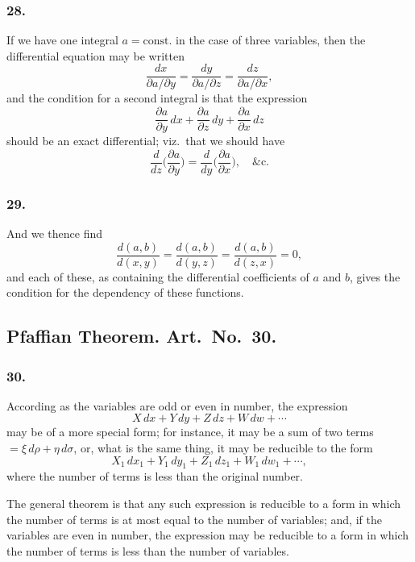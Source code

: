 \documentclass[12pt,a4paper]{article}
\theoremstyle{plain}
\begin{document}
\newpage
\setcounter{page}{124}

\subsubsection*{28.}

If we have one integral $a = \text{const.}$ in the case of three variables, then the differential equation may be written
\[
\frac{dx}{\partial a/\partial y} = \frac{dy}{\partial a/\partial z} = \frac{dz}{\partial a/\partial x},
\]
and the condition for a second integral is that the expression
\[
\frac{\partial a}{\partial y}\,dx + \frac{\partial a}{\partial z}\,dy + \frac{\partial a}{\partial x}\,dz
\]
should be an exact differential; viz.~that we should have
\[
\frac{d}{dz}\biggl(\frac{\partial a}{\partial y}\biggr) = \frac{d}{dy}\biggl(\frac{\partial a}{\partial x}\biggr), \quad \&\text{c.}
\]

\subsubsection*{29.}

And we thence find
\[
\frac{d(a, b)}{d(x, y)} = \frac{d(a, b)}{d(y, z)} = \frac{d(a, b)}{d(z, x)} = 0,
\]
and each of these, as containing the differential coefficients of $a$ and $b$, gives the condition for the dependency of these functions.

\subsection*{Pfaffian Theorem. Art.~No.~30.}

\subsubsection*{30.}

According as the variables are odd or even in number, the expression
\[
X\,dx + Y\,dy + Z\,dz + W\,dw + \cdots
\]
may be of a more special form; for instance, it may be a sum of two terms $= \xi\,d\rho + \eta\,d\sigma$, or, what is the same thing, it may be reducible to the form
\[
X_{1}\,dx_{1} + Y_{1}\,dy_{1} + Z_{1}\,dz_{1} + W_{1}\,dw_{1} + \cdots,
\]
where the number of terms is less than the original number.

\newpage
\setcounter{page}{125}

The general theorem is that any such expression is reducible to a form in which the number of terms is at most equal to the number of variables; and, if the variables are even in number, the expression may be reducible to a form in which the number of terms is less than the number of variables.
\end{document}
